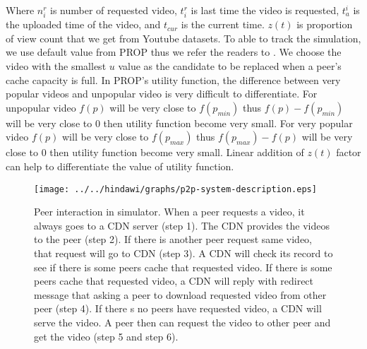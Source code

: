 Where $n_i^r$ is number of requested video, $t_i^r$ is last time the video is requested, $t_a^i$ is the uploaded time of the video, and $t_{cur}$ is the current time.
$z(t)$ is proportion of view count that we get from Youtube datasets.  
To able to track the simulation, we use default value from PROP thus we refer the readers to \cite{1613869}.
We choose the video with the smallest $u$ value as the candidate to be replaced when a peer's cache capacity is full.
In PROP's utility function, the difference between very popular videos and unpopular video is very difficult to differentiate. 
For unpopular video $f(p)$ will be very close to $f(p_{min})$ thus $f(p) - f(p_{min})$ will be very close to $0$ then utility function become very small.
For very popular video $f(p)$ will be very close to $f(p_{max})$ thus $f(p_{max}) - f(p)$ will be very close to $0$ then utility function become very small.  
Linear addition of $z(t)$ factor can help to differentiate the value of utility function.

\begin{figure}[!t]
\begin{center}
\texttt{[image: ../../hindawi/graphs/p2p-system-description.eps]}
\end{center}
\caption{Peer interaction in simulator.
When a peer requests a video, it always goes to a CDN server (step 1). 
The CDN provides the videos to the peer (step 2). 
If there is another peer request same video, that request will go to CDN (step 3).  
A CDN will check its record to see if there is some peers cache that requested video.  
If there is some peers cache that requested video, a CDN will reply with redirect message that asking a peer to download requested video from other peer (step 4).
If there s no peers have requested video, a CDN will serve the video.   
A peer then can request the video to other peer and get the video (step 5 and step 6).}
\label{fig:p2pcdninteractioninsimulator}
\end{figure} 



